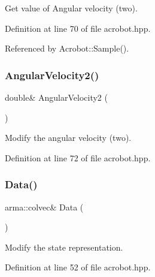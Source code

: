 Get value of Angular velocity (two). 



Definition at line 70 of file acrobot.\+hpp.



Referenced by Acrobot\+::\+Sample().

\mbox{\label{classmlpack_1_1rl_1_1Acrobot_1_1State_a4f4ef10ade1253d134e5415a1f372546}} 
\subsubsection{Angular\+Velocity2()\hspace{0.1cm}{\footnotesize\ttfamily [2/2]}}
{\footnotesize\ttfamily double\& Angular\+Velocity2 (\begin{DoxyParamCaption}{ }\end{DoxyParamCaption})\hspace{0.3cm}{\ttfamily [inline]}}



Modify the angular velocity (two). 



Definition at line 72 of file acrobot.\+hpp.

\mbox{\label{classmlpack_1_1rl_1_1Acrobot_1_1State_ad6a50c7b5fced2e931d9a4b4ff989ed6}} 
\subsubsection{Data()}
{\footnotesize\ttfamily arma\+::colvec\& Data (\begin{DoxyParamCaption}{ }\end{DoxyParamCaption})\hspace{0.3cm}{\ttfamily [inline]}}



Modify the state representation. 



Definition at line 52 of file acrobot.\+hpp.

\mbox{\label{classmlpack_1_1rl_1_1Acrobot_1_1State_a8c1a320788b55fad936455caf0acb62a}} 
